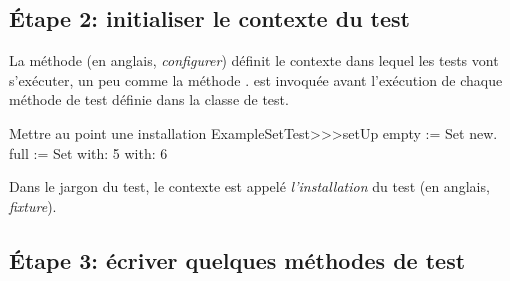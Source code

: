 \documentclass[a4paper,10pt,twoside]{book}
\begin{document}
\subsection{\'Etape 2: initialiser le contexte du test}

La méthode  (en anglais, \emph{configurer}) définit le contexte dans lequel les tests vont s'exécuter, un peu comme la méthode .  est invoquée avant l'exécution de chaque méthode de test définie dans la classe de test.

% 

\begin{method}[setupExampleSetTest]{Mettre au point une installation}
ExampleSetTest>>>setUp
	empty := Set new.
	full := Set with: 5 with: 6
\end{method}

\noindent
Dans le jargon du test, le contexte est appelé \emph{l'installation}
du test (en anglais, \emph{fixture}).

\subsection{\'Etape 3: écriver quelques méthodes de test}
\end{document}
